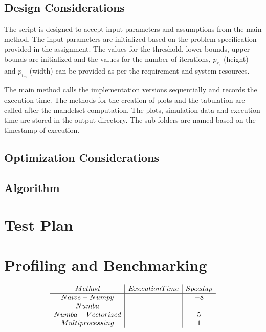 \documentclass{article}
\begin{document}
\subsection{Design Considerations}
The script is designed to accept input parameters and assumptions from the main method. The input parameters are initialized based on the problem specification provided in the assignment. The values for the threshold, lower bounds, upper bounds are initialized and the values for the number of iterations,  $p_{r_e}$ (height) and $p_{i_m}$ (width) can be provided as per the requirement and system resources.

The main method calls the implementation versions sequentially and records the execution time. The methods for the creation of plots and the tabulation are called after the mandelset computation. The plots, simulation data and execution time are stored in the output directory. The sub-folders are named based on the timestamp of execution.    

\subsection{Optimization Considerations}



\subsection{Algorithm}

\section{Test Plan}



\section{Profiling and Benchmarking}

\begin{align}
    \begin{array}{c | c | c}
         Method  & Execution Time & Speedup \\ 
         \hline %
         Naive-Numpy   &  & -8 \\
         Numba      &  &    \\
         Numba - Vectorized &  & 5 \\
         Multiprocessing &  & 1 \\
    \end{array}
\end{align}
\end{document}
